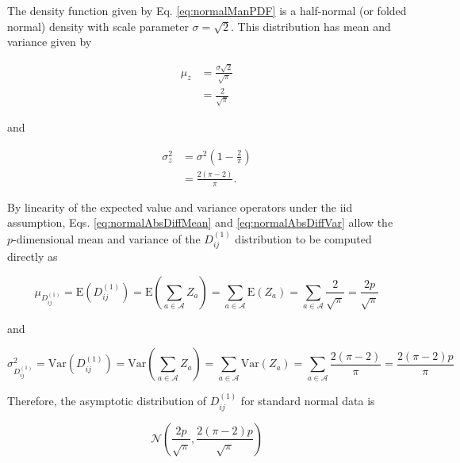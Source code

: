 \documentclass[10pt,letterpaper]{article}\usepackage[]{graphicx}\usepackage[]{color}
\begin{document}
The density function given by Eq. \ref{eq:normalManPDF} is a half-normal (or folded normal) density with scale parameter $\sigma = \sqrt{2}$. This distribution has mean and variance given by

\begin{equation}\label{eq:normalAbsDiffMean}
\begin{aligned}
\mu_z &= \frac{\sigma \sqrt{2}}{\sqrt{\pi}} \\
&= \frac{2}{\sqrt{\pi}}
\end{aligned}
\end{equation}

\noindent and

\begin{equation}\label{eq:normalAbsDiffVar}
\begin{aligned}
\sigma^2_z &= \sigma^2\left(1 - \frac{2}{\pi}\right) \\
&= \frac{2(\pi-2)}{\pi}.
\end{aligned}
\end{equation}

By linearity of the expected value and variance operators under the iid assumption, Eqs. \ref{eq:normalAbsDiffMean} and \ref{eq:normalAbsDiffVar} allow the $p\text{-dimensional}$ mean and variance of the $D^{(1)}_{ij}$ distribution to be computed directly as

\begin{equation}\label{eq:normalManMean}
\mu_{D^{(1)}_{ij}} = \text{E}\left(D^{(1)}_{ij}\right) = \text{E}\left(\sum_{a \in \mathcal{A}} Z_a\right) = \sum_{a \in \mathcal{A}} \text{E}\left(Z_a\right) = \sum_{a \in \mathcal{A}} \frac{2}{\sqrt{\pi}} = \frac{2p}{\sqrt{\pi}}
\end{equation}

\noindent and

\begin{equation}\label{eq:normalManVar}
\sigma^2_{D^{(1)}_{ij}} = \text{Var}\left(D^{(1)}_{ij}\right) = \text{Var}\left(\sum_{a \in \mathcal{A}} Z_a\right) = \sum_{a \in \mathcal{A}} \text{Var}\left(Z_a\right) = \sum_{a \in \mathcal{A}} \frac{2(\pi - 2)}{\pi} = \frac{2(\pi - 2)p}{\pi}
\end{equation}

Therefore, the asymptotic distribution of $D^{(1)}_{ij}$ for standard normal data is

\begin{equation}\label{eq:normalManDistr}
\mathcal{N}\left(\frac{2p}{\sqrt{\pi}},\frac{2(\pi - 2)p}{\sqrt{\pi}}\right)
\end{equation}
\end{document}
